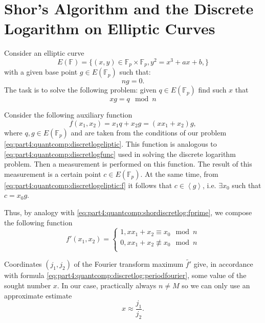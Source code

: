 \section{Shor's Algorithm and the Discrete Logarithm on Elliptic Curves} 
Consider an elliptic curve 
\[
E\left(\mathbb{F}\right) = \{
(x,y) \in \mathbb{F}_p \times \mathbb{F}_p, y^2 = x^3 +a x + b,
\}
\]
with a given base point $g \in E\left(\mathbb{F}_p\right)$ such that: 
\[
n g = 0.
\]
The task is to solve the following problem: given $q
\in E\left(\mathbb{F}_p\right)$ find such $x$ that
\begin{equation}
x g = q \mod n
\label{eq:part4:quantcomp:discretlogeliptic}
\end{equation}

Consider the following auxiliary function
\begin{equation}
f(x_1, x_2) = x_1 q + x_2 g = \left(x x_1 + x_2\right) g,
\label{eq:part4:quantcomp:discretlogeliptic:f}
\end{equation}
where $q,g \in E\left(\mathbb{F}_p\right)$ and are taken from the conditions of our
problem \eqref{eq:part4:quantcomp:discretlogeliptic}. This function
is analogous to \eqref{eq:part4:quantcomp:discretlogfunc}
used in solving the discrete logarithm problem. Then
a measurement is performed on this function. The result of this measurement
is a certain point $c \in E\left(\mathbb{F}_p\right)$. At the same time,
from \eqref{eq:part4:quantcomp:discretlogeliptic:f} it follows that 
$c \in \left<g\right>$, i.e. $\exists x_0$ such that $c = x_0 g$. 

Thus, by analogy with \eqref{eq:part4:quantcomp:shordiscretlog:fprime}, we
compose the following function 
\begin{equation}
\label{eq:part4:quantcomp:shorelliptic:fprime}
f'\left(x_1, x_2\right) = 
\begin{cases}
1, x x_1 + x_2 \equiv x_0 \mod n \\
0, x x_1 + x_2 \not\equiv x_0 \mod n \\
\end{cases}
\end{equation}

Coordinates $(j_1,j_2)$ of the Fourier transform maximum $\tilde{f'}$ give, in
accordance with formula
\eqref{eq:part4:quantcomp:discretlog:periodfourier}, some value
of the sought number $x$. In our case, practically always $n \ne M$
so we can only use an approximate estimate
\[
x \approx \frac{j_1}{j_2}.
\]

